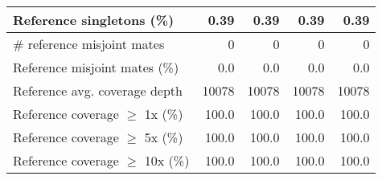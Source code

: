\documentclass[12pt,a4paper]{article}
\begin{document}
\begin{table}[ht]
\begin{center}
\begin{tabular}{|l*{4}{|r}|}
Reference singletons (\%) & 0.39 & 0.39 & 0.39 & 0.39 \\ \hline
\# reference misjoint mates & 0 & 0 & 0 & 0 \\ \hline
Reference misjoint mates (\%) & 0.0 & 0.0 & 0.0 & 0.0 \\ \hline
Reference avg. coverage depth & 10078 & 10078 & 10078 & 10078 \\ \hline
Reference coverage $\geq$ 1x (\%) & 100.0 & 100.0 & 100.0 & 100.0 \\ \hline
Reference coverage $\geq$ 5x (\%) & 100.0 & 100.0 & 100.0 & 100.0 \\ \hline
Reference coverage $\geq$ 10x (\%) & 100.0 & 100.0 & 100.0 & 100.0 \\ \hline
\end{tabular}
\end{center}
\end{table}
\end{document}
